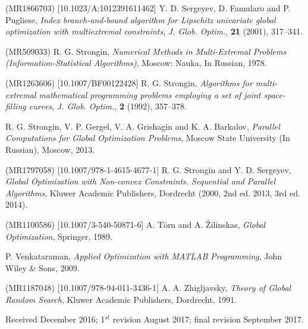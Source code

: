 \documentclass{naco}
\theoremstyle{definition}
\begin{document}
\begin{thebibliography}{99}
 (MR1866703) [10.1023/A:1012391611462]
\newblock Y. D. Sergeyev, D. Famularo and P. Pugliese,
\newblock \emph{\emph{Index branch-and-bound algorithm for Lipschitz univariate global optimization with multiextremal constraints}},
\newblock \emph{J. Glob. Optim.}, \textbf{21} (2001), 317--341.

 (MR509033)
\newblock R. G. Strongin,
\newblock \emph{Numerical Methods in Multi-Extremal Problems (Information-Statistical Algorithms)},
\newblock Moscow: Nauka, In Russian, 1978.

 (MR1263606) [10.1007/BF00122428]
\newblock R. G. Strongin,
\newblock \emph{\emph{Algorithms for multi-extremal mathematical programming problems employing a set of joint space-filling curves}},
\newblock \emph{J. Glob. Optim.}, \textbf{2} (1992), 357--378.

\newblock R. G. Strongin, V. P. Gergel, V. A. Grishagin and K. A. Barkalov,
\newblock \emph{Parallel Computations for Global Optimization Problems},
\newblock Moscow State University (In Russian), Moscow, 2013.

 (MR1797058) [10.1007/978-1-4615-4677-1]
\newblock R. G. Strongin and Y. D. Sergeyev,
\newblock \emph{Global Optimization with Non-convex Constraints. Sequential and Parallel Algorithms},
\newblock Kluwer Academic Publishers, Dordrecht (2000, 2nd ed. 2013, 3rd ed. 2014).

 (MR1100586) [10.1007/3-540-50871-6]
\newblock A. T\"orn and A. \v Zilinskas,
\newblock \emph{Global Optimization},
\newblock Springer, 1989.

\newblock P. Venkataraman,
\newblock \emph{Applied Optimization with MATLAB Programming},
\newblock John Wiley \& Sons, 2009.

 (MR1187048) [10.1007/978-94-011-3436-1]
\newblock A. A. Zhigljavsky,
\newblock \emph{Theory of Global Random Search},
\newblock Kluwer Academic Publishers, Dordrecht, 1991.



\end{thebibliography}

\medskip

Received December 2016;  1$^{st}$ revision August 2017; final revision September  2017.

\medskip
\end{document}
